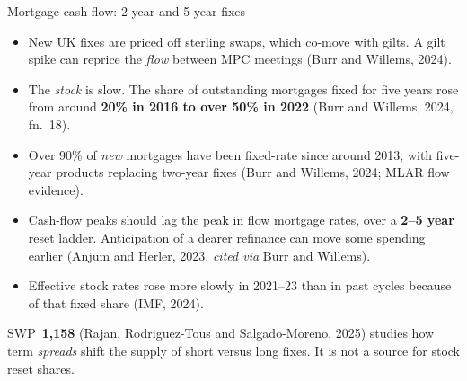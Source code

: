 \documentclass[11pt,aspectratio=169]{beamer}
\begin{document}
\begin{frame}{Mortgage cash flow: 2-year and 5-year fixes}
  \begin{itemize}
    \item New UK fixes are priced off sterling swaps, which co-move with
          gilts. A gilt spike can reprice the \emph{flow} between MPC
          meetings (Burr and Willems, 2024).
    \item The \emph{stock} is slow. The share of outstanding mortgages
          fixed for five years rose from around \textbf{20\% in 2016 to
          over 50\% in 2022} (Burr and Willems, 2024, fn.~18).
    \item Over 90\% of \emph{new} mortgages have been fixed-rate since
          around 2013, with five-year products replacing two-year fixes
          (Burr and Willems, 2024; MLAR flow evidence).
    \item Cash-flow peaks should lag the peak in flow mortgage rates,
          over a \textbf{2--5 year} reset ladder. Anticipation of a
          dearer refinance can move some spending earlier
          (Anjum and Herler, 2023, \emph{cited via} Burr and Willems).
    \item Effective stock rates rose more slowly in 2021--23 than in
          past cycles because of that fixed share (IMF, 2024).
  \end{itemize}
  \vspace{0.15em}
  {\scriptsize SWP~\textbf{1,158} (Rajan, Rodriguez-Tous and Salgado-Moreno, 2025)
  studies how term \emph{spreads} shift the supply of short versus long
  fixes. It is not a source for stock reset shares.}
\end{frame}
\end{document}
